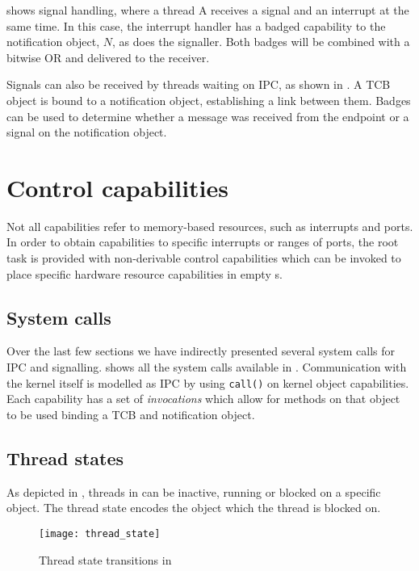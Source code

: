  shows signal handling, where a thread A receives a signal and an interrupt at the
same time. In this case, the interrupt handler has a badged capability to the notification object,
$N$, as does the signaller. Both badges will be combined with a bitwise OR and delivered to the
receiver.

Signals can also be received by threads waiting on \gls{IPC}, as shown in . A
\gls{TCB} object is bound to a notification object, establishing a link between them. Badges can be
used to determine whether a message was received from the endpoint or a signal on the notification object.

\section{Control capabilities}

Not all capabilities refer to memory-based resources, such as interrupts and \IO ports.
In order to obtain capabilities to specific interrupts or ranges of \IO ports, the root task is
provided with non-derivable control capabilities which can be invoked to place specific hardware
resource capabilities in empty s.


\subsection{System calls}

Over the last few sections we have indirectly presented several system calls for \gls{IPC} and
signalling.  shows all the system calls available in \selfour. Communication
with the kernel itself is modelled as \gls{IPC} by using \texttt{call()} on kernel object
capabilities. Each capability has a set of \emph{invocations} which allow for methods on that object
to be used \eg binding a \gls{TCB} and notification object.

\subsection{Thread states}

As depicted in , threads in \selfour can be inactive, running or blocked on a
specific object. The thread state encodes the object which the thread is blocked on. 

\begin{figure}[h!tb]
    \centering
    \texttt{[image: thread\_state]}
    \caption{Thread state transitions in \selfour}
    \label{f:thread_state}
\end{figure}


